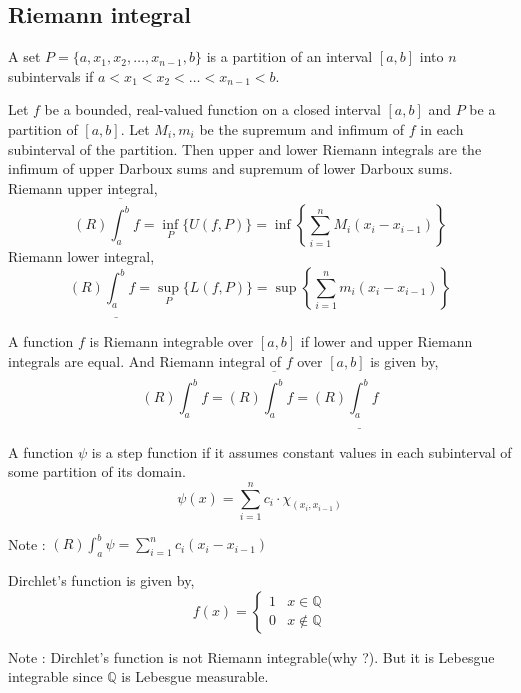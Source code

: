 \subsection{Riemann integral}
\begin{definition}[partition]
	A set $P = \{a,x_1,x_2,\dots,x_{n-1},b \}$ is a partition of an interval $[a,b]$ into $n$ subintervals if $a < x_1 < x_2 < \dots < x_{n-1} < b$.
\end{definition}
\begin{definition}
	Let $f$ be a bounded, real-valued function on a closed interval $[a,b]$ and $P$ be a partition of $[a,b]$.
	Let $M_i,m_i$ be the supremum and infimum of $f$ in each subinterval of the partition.
	Then upper and lower Riemann integrals are the infimum of upper Darboux sums and supremum of lower Darboux sums.\\

	Riemann upper integral, 
	\begin{equation}
	 (R)\overline{\int_a^b} f = \inf_P \{ U(f,P) \} = \inf \left\{ \sum_{i=1}^n M_i (x_i - x_{i-1}) \right\} 
	\end{equation}
	Riemann lower integral, 
	\begin{equation}
	 (R)\underline{\int_a^b} f = \sup_P \{ L(f,P) \} = \sup \left\{ \sum_{i=1}^n m_i (x_i - x_{i-1}) \right\} 
	\end{equation}
\end{definition}
\begin{definition}
	A function $f$ is Riemann integrable over $[a,b]$ if lower and upper Riemann integrals are equal.
	And Riemann integral of $f$ over $[a,b]$ is given by,
	\begin{equation}
		(R)\int_a^b f = (R)\overline{\int_a^b} f = (R) \underline{\int_a^b} f 
	\end{equation}
\end{definition}

\begin{definition}
	A function $\psi$ is a step function if it assumes constant values in each subinterval of some partition of its domain.
	$$ \psi(x) = \sum_{i = 1}^n c_i \cdot \chi_{(x_i,x_{i-1})} $$
\end{definition}
Note : $\displaystyle (R)\int_a^b \psi = \sum_{i=1}^n c_i (x_i-x_{i-1})$
\begin{definition}
	Dirchlet's function is given by,
	$$ f(x) = \begin{cases} 1 & x \in \mathbb{Q} \\ 0 & x \notin \mathbb{Q} \end{cases} $$
\end{definition}
Note : Dirchlet's function is not Riemann integrable(why ?). But it is Lebesgue integrable since $\mathbb{Q}$ is Lebesgue measurable.

